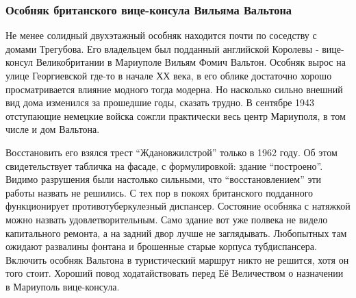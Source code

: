  
 
 
 
 

\subsubsection{Особняк британского вице-консула Вильяма Вальтона}

Не менее солидный двухэтажный особняк находится почти по соседству с домами
Трегубова. Его владельцем был подданный английской Королевы - вице-консул
Великобритании в Мариуполе Вильям Фомич Вальтон. Особняк вырос на улице
Георгиевской где-то в начале ХХ века, в его облике достаточно хорошо
просматривается влияние модного тогда модерна. Но насколько сильно внешний вид
дома изменился за прошедшие годы, сказать трудно. В сентябре 1943 отступающие
немецкие войска сожгли практически весь центр Мариуполя, в том числе и дом
Вальтона.


Восстановить его взялся трест \enquote{Ждановжилстрой} только в 1962 году. Об этом
свидетельствует табличка на фасаде, с формулировкой: здание \enquote{построено}. Видимо
разрушения были настолько сильными, что \enquote{восстановлением} эти работы назвать не
решились. С тех пор в покоях британского подданного функционирует
противотуберкулезный диспансер. Состояние особняка с натяжкой можно назвать
удовлетворительным. Само здание вот уже полвека не видело капитального ремонта,
а на задний двор лучше не заглядывать. Любопытных там ожидают развалины фонтана
и брошенные старые корпуса тубдиспансера. Включить особняк Вальтона в
туристический маршрут никто не решится, хотя он того стоит. Хороший повод
ходатайствовать перед Её Величеством о назначении в Мариуполь вице-консула.
